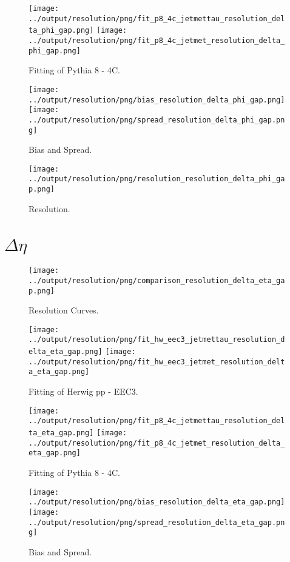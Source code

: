 \documentclass[11pt]{book}
\begin{document}
\begin{figure}[ht]
\centering
\texttt{[image: ../output/resolution/png/fit\_p8\_4c\_jetmettau\_resolution\_delta\_phi\_gap.png]}
\texttt{[image: ../output/resolution/png/fit\_p8\_4c\_jetmet\_resolution\_delta\_phi\_gap.png]}
\caption{Fitting of Pythia 8 - 4C.}
\end{figure}

\begin{figure}[ht]
\centering
\texttt{[image: ../output/resolution/png/bias\_resolution\_delta\_phi\_gap.png]}
\texttt{[image: ../output/resolution/png/spread\_resolution\_delta\_phi\_gap.png]}
\caption{Bias and Spread.}
\end{figure}


\begin{figure}[ht]
\centering
\texttt{[image: ../output/resolution/png/resolution\_resolution\_delta\_phi\_gap.png]}
\caption{Resolution.}
\end{figure}
\clearpage


\section{$\Delta\eta$}

\begin{figure}[ht]
\centering
\texttt{[image: ../output/resolution/png/comparison\_resolution\_delta\_eta\_gap.png]}
\caption{Resolution Curves.}
\end{figure}


\begin{figure}[ht]
\centering
\texttt{[image: ../output/resolution/png/fit\_hw\_eec3\_jetmettau\_resolution\_delta\_eta\_gap.png]}
\texttt{[image: ../output/resolution/png/fit\_hw\_eec3\_jetmet\_resolution\_delta\_eta\_gap.png]}
\caption{Fitting of Herwig pp - EEC3.}
\end{figure}

\begin{figure}[ht]
\centering
\texttt{[image: ../output/resolution/png/fit\_p8\_4c\_jetmettau\_resolution\_delta\_eta\_gap.png]}
\texttt{[image: ../output/resolution/png/fit\_p8\_4c\_jetmet\_resolution\_delta\_eta\_gap.png]}
\caption{Fitting of Pythia 8 - 4C.}
\end{figure}

\begin{figure}[ht]
\centering
\texttt{[image: ../output/resolution/png/bias\_resolution\_delta\_eta\_gap.png]}
\texttt{[image: ../output/resolution/png/spread\_resolution\_delta\_eta\_gap.png]}
\caption{Bias and Spread.}
\end{figure}
\end{document}
